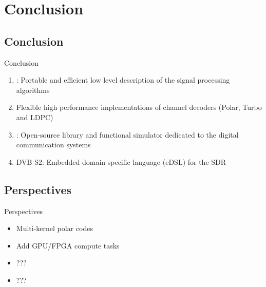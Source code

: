 
\section[Conclusion]{Conclusion}

\subsection[Conclusion]{Conclusion}

\begin{frame}{Conclusion}
  \vfill
  \begin{enumerate}
    \item<1-> \MIPP: Portable and efficient low level description of the signal processing algorithms~\cite{Cassagne2018}
    \vspace{.3em}
    \item<2-> Flexible high performance implementations of channel decoders (Polar, Turbo and LDPC)~\cite{Cassagne2015c,Cassagne2016a,Cassagne2016b,Leonardon2019,Ghaffari2019}
    \vspace{.3em}
    \item<3-> \AFFECT: Open-source library and functional simulator dedicated to the digital communication systems~\cite{Cassagne2017,Cassagne2017a,Cassagne2019a}
    \vspace{.3em}
    \item<4-> DVB-S2: Embedded domain specific language (eDSL) for the SDR
  \end{enumerate}
  \vfill
\end{frame}

\subsection[Perspectives]{Perspectives}

\begin{frame}{Perspectives}
  \vfill
  \begin{itemize}
    \item<1-> Multi-kernel polar codes
    \vspace{.3em}
    \item<2-> Add GPU/FPGA compute tasks
    \vspace{.3em}
    \item<3-> ???
    \vspace{.3em}
    \item<4-> ???
  \end{itemize}
  \vfill
\end{frame}
